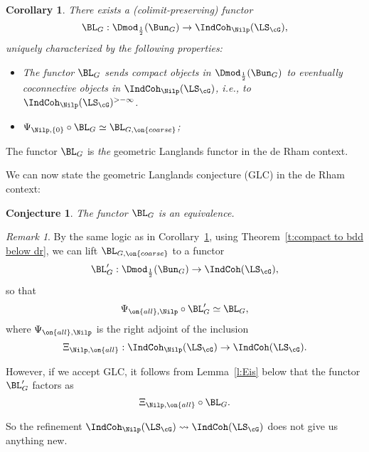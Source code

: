 \documentclass[9pt]{amsart}
\newtheorem{cor}[subsubsection]{Corollary}
\newtheorem{conj}[subsubsection]{Conjecture}
\theoremstyle{remark}
\newtheorem{rem}[subsubsection]{Remark}
\theoremstyle{definition}
\theoremstyle{remark}
\newcommand{\thmref}[1]{Theorem~\ref{#1}}
\newcommand{\lemref}[1]{Lemma~\ref{#1}}
\newcommand{\corref}[1]{Corollary~\ref{#1}}
\numberwithin{equation}{section}
\begin{document}
\begin{cor} \label{c:main dr}
There exists a (colimit-preserving) functor
$$\BL_G:\Dmod_{\frac{1}{2}}(\Bun_G)\to \IndCoh_\Nilp(\LS_\cG),$$
uniquely characterized by the following properties:

\begin{itemize}

\item The functor $\BL_G$  sends compact objects in 
$\Dmod_{\frac{1}{2}}(\Bun_G)$ to eventually coconnective objects
in $\IndCoh_\Nilp(\LS_\cG)$, i.e., to $\IndCoh_\Nilp(\LS_\cG)^{>-\infty}$. 

\smallskip

\item $\Psi_{\Nilp,\{0\}}\circ \BL_G\simeq \BL_{G,\on{coarse}}$;

\end{itemize}

\end{cor} 

\sssec{}

The functor $\BL_G$ is \emph{the} geometric Langlands functor in the de
Rham context. 

\medskip

We can now state the geometric Langlands conjecture (GLC) in the de Rham context:

\begin{conj} \label{c:GLC dR}
The functor $\BL_G$ is an equivalence.
\end{conj} 

\begin{rem}

By the same logic as in \corref{c:main dr}, using \thmref{t:compact to bdd below dr}, we can lift $\BL_{G,\on{coarse}}$ to a functor 
$$\BL'_G:\Dmod_{\frac{1}{2}}(\Bun_G)\to \IndCoh(\LS_\cG),$$
so that
$$\Psi_{\on{all},\Nilp}\circ \BL'_G\simeq \BL_G,$$
where $\Psi_{\on{all},\Nilp}$ is the right adjoint of the inclusion
$$\Xi_{\Nilp,\on{all}}:\IndCoh_\Nilp(\LS_\cG)\to \IndCoh(\LS_\cG).$$

However, if we accept GLC, it follows from \lemref{l:Eis} below that the functor $\BL'_G$
factors as 
$$\Xi_{\Nilp,\on{all}}\circ \BL_G.$$

So the refinement $\IndCoh_\Nilp(\LS_\cG)\rightsquigarrow \IndCoh(\LS_\cG)$ does not give
us anything new.

\end{rem}
\end{document}
